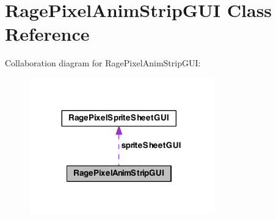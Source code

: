 \hypertarget{class_rage_pixel_anim_strip_g_u_i}{\section{Rage\-Pixel\-Anim\-Strip\-G\-U\-I Class Reference}
\label{class_rage_pixel_anim_strip_g_u_i}
}


Collaboration diagram for Rage\-Pixel\-Anim\-Strip\-G\-U\-I\-:
\nopagebreak
\begin{figure}[H]
\begin{center}
\leavevmode
\includegraphics[width=227pt]{class_rage_pixel_anim_strip_g_u_i__coll__graph}
\end{center}
\end{figure}
